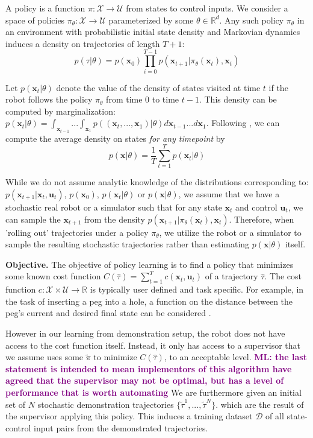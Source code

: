 \documentclass[10pt, conference]{ieeeconf}      %
\newcommand{\bu}{\mathbf{u}}
\newcommand{\bx}{\mathbf{x}}
\newcommand{\mlnote}[1]{\ifthenelse{ \boolean{include-notes}}%
 {\textcolor{purple}{\textbf{ML: #1}}}{}}
\begin{document}
A policy is a function $\pi: \mathcal{X} \to \mathcal{U}$ from states to control inputs. 
We consider a space of policies $\pi_{\theta}:\mathcal{X}\to \mathcal{U}$ parameterized by some $\theta\in \mathbb{R}^d$. Any such policy $\pi_{\theta}$ in an environment with probabilistic initial state density and Markovian dynamics
induces a density on trajectories of length $T+1$: $$p(\tau | \theta)=
p(\bx_0)\prod_{i=0}^{T-1}p(\bx_{t+1}|\pi_{\theta}(\bx_t),\bx_t)$$


Let $p(\bx_t|\theta)$ denote the value of the density of states visited at time $t$ if the robot follows the policy
$\pi_{\theta}$ from time $0$ to time $t-1$. This density can be computed by marginalization: $p(\bx_t|\theta) =
\int_{\bx_{t-1}}...\int_{\bx_1} p((\bx_t,...,\bx_1)|\theta) d\bx_{t-1}...d\bx_1$. Following \cite{ross2010reduction}, we can compute
the average density on states \emph{for any timepoint} by 
\begin{equation}
p(\bx|\theta) = \frac{1}{T} \sum^T_{t=1} p(\bx_t|\theta)
\label{eq:density}
\end{equation}


While we do not assume analytic knowledge of the distributions corresponding to: $p(\bx_{t+1}|\bx_t,\bu_t)$, $p(\bx_0)$, $p(\bx_t|
\theta)$ or $p(\bx|\theta)$, we assume that we have a stochastic real robot or a simulator such that for any state
$\bx_t$ and control $\bu_t$, we can sample the $\bx_{t+1}$ from the density $p(\bx_{t+1}|\pi_{\theta}(\bx_t),\bx_t)$. 
Therefore, when 'rolling out' trajectories under a policy
$\pi_{\theta}$, we utilize the robot or a simulator to sample the resulting stochastic trajectories rather than
estimating $p(\bx|\theta)$ itself.

\noindent\textbf{Objective.} The objective of  policy learning is to find a policy that minimizes some known cost function $C(\hat{\tau}) = \sum^T_{t=1} c(\bx_t,\bu_t)$ of a trajectory $\hat{\tau}$. The cost function $c:\mathcal{X}\times \mathcal{U}\to \mathbb{R}$ is typically user defined and task specific. 
For example, in the task of inserting a peg into a hole, a function on the distance between the peg's current and desired final state can
be considered \cite{levine2015end}.  

However in our learning from demonstration setup, the robot does not have access to the cost function itself. Instead, it only has access to 
a supervisor that we assume uses some $\tilde{\pi}$ to minimize $C(\hat{\tau})$, to an acceptable level. \mlnote{the last statement is intended to mean implementors of this algorithm have agreed that the supervisor may not be optimal, but has a level of performance that is worth automating} We are furthermore given
an initial set of $N$ stochastic demonstration trajectories $\lbrace \tilde{\tau}^1,...,\tilde{\tau}^N \rbrace$. 
which are the result of the supervisor applying this policy. This induces a training dataset $\mathcal{D}$ of all state-control input pairs from the demonstrated trajectories. 
\end{document}
